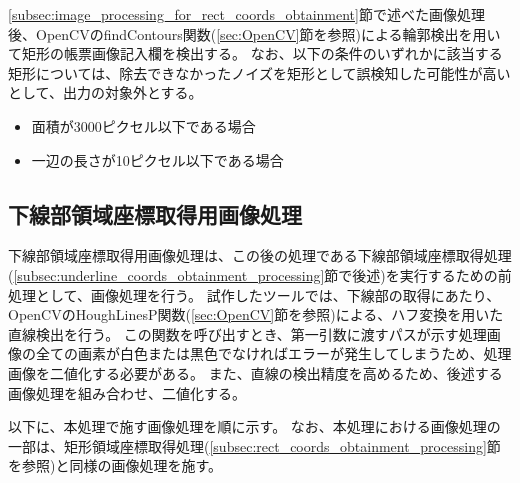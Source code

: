 \ref{subsec:image_processing_for_rect_coords_obtainment}節で述べた画像処理後、OpenCVのfindContours関数(\ref{sec:OpenCV}節を参照)による輪郭検出を用いて矩形の帳票画像記入欄を検出する。
なお、以下の条件のいずれかに該当する矩形については、除去できなかったノイズを矩形として誤検知した可能性が高いとして、出力の対象外とする。

\begin{itemize}
    \item 面積が3000ピクセル以下である場合
    \item 一辺の長さが10ピクセル以下である場合
\end{itemize}

\subsection{下線部領域座標取得用画像処理}\label{subsec:image_processing_for_underline_coords_obtainment}
下線部領域座標取得用画像処理は、この後の処理である下線部領域座標取得処理(\ref{subsec:underline_coords_obtainment_processing}節で後述)を実行するための前処理として、画像処理を行う。
試作したツールでは、下線部の取得にあたり、OpenCVのHoughLinesP関数(\ref{sec:OpenCV}節を参照)による、ハフ変換を用いた直線検出を行う。
この関数を呼び出すとき、第一引数に渡すパスが示す処理画像の全ての画素が白色または黒色でなければエラーが発生してしまうため、処理画像を二値化する必要がある。
また、直線の検出精度を高めるため、後述する画像処理を組み合わせ、二値化する。

以下に、本処理で施す画像処理を順に示す。
なお、本処理における画像処理の一部は、矩形領域座標取得処理(\ref{subsec:rect_coords_obtainment_processing}節を参照)と同様の画像処理を施す。

